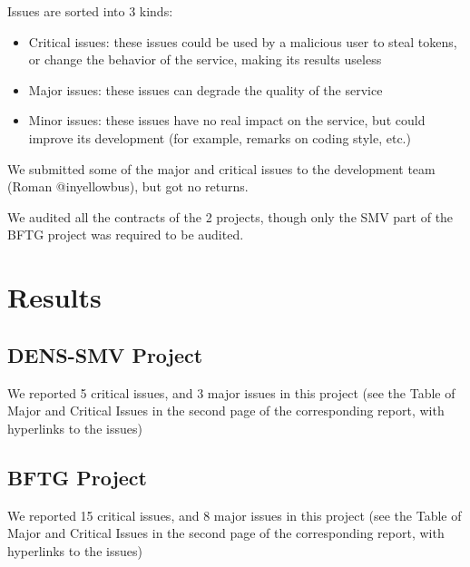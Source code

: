\documentclass{article}
\begin{document}
Issues are sorted into 3 kinds:
\begin{itemize}
\item Critical issues: these issues could be used by a malicious user
  to steal tokens, or change the behavior of the service, making its
  results useless
\item Major issues: these issues can degrade the quality of the
  service
\item Minor issues: these issues have no real impact on the service,
  but could improve its development (for example, remarks on coding
  style, etc.)
\end{itemize}

We submitted some of the major and critical issues to the development
team (Roman @inyellowbus), but got no returns. 

We audited all the contracts of the 2 projects, though only the SMV
part of the BFTG project was required to be audited.

\section{Results}

\subsection{DENS-SMV Project}

We reported 5 critical issues, and 3 major issues in this project
(see the Table of Major and Critical Issues in the second page of the
corresponding report, with hyperlinks to the issues)

\subsection{BFTG Project}

We reported 15 critical issues, and 8 major issues in this project
(see the Table of Major and Critical Issues in the second page of the
corresponding report, with hyperlinks to the issues)
\end{document}
